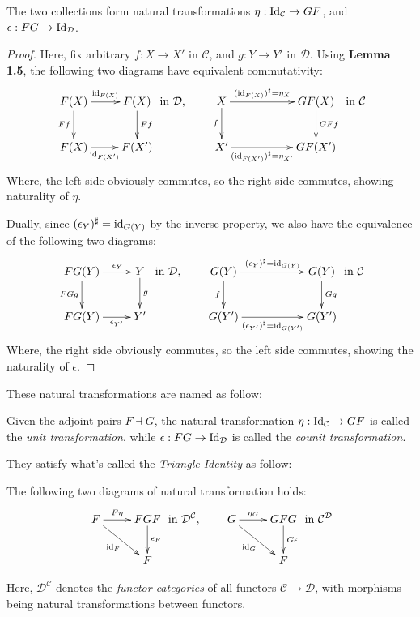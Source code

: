 \documentclass{article}
\begin{document}
\begin{prop}
The two collections form natural transformations $\eta:\mathrm{Id}_\mathcal{C}\rightarrow GF$, and $\epsilon:FG\rightarrow \mathrm{Id}_\mathcal{D}$.
\end{prop}
\begin{proof}
    Here, fix arbitrary $f:X\rightarrow X'$ in $\mathcal{C}$, and $g:Y\rightarrow Y'$ in $\mathcal{D}$. Using \textbf{Lemma 1.5}, the following two diagrams have equivalent commutativity:
    \[\xymatrix{
        F(X) \ar[d]_-{Ff} \ar[r]^-{\id_{F(X)}} & F(X) \ar[d]^-{Ff}\\
        F(X)\ar[r]_-{\id_{F(X')}} & F(X')
    } \text{ in }\mathcal{D},\quad \quad \xymatrix{
        X \ar[d]_-{f} \ar[rr]^-{(\id_{F(X)})^\sharp=\eta_X} && GF(X) \ar[d]^-{GFf}\\
        X'\ar[rr]_-{(\id_{F(X')})^\sharp=\eta_{X'}} && GF(X')
    } \text{ in }\mathcal{C}\]
    Where, the left side obviously commutes, so the right side commutes, showing naturality of $\eta$.

    Dually, since $(\epsilon_Y)^\sharp = \mathrm{id}_{G(Y)}$ by the inverse property, we also have the equivalence of the following two diagrams:
    \[\xymatrix{
        FG(Y) \ar[d]_-{FGg} \ar[r]^-{\epsilon_Y} & Y \ar[d]^-{g}\\
        FG(Y)\ar[r]_-{\epsilon_{Y'}} & Y'
    } \text{ in }\mathcal{D},\quad \quad \xymatrix{
        G(Y) \ar[d]_-{f} \ar[rr]^-{(\epsilon_Y)^\sharp = \id_{G(Y)}} && G(Y) \ar[d]^-{Gg}\\
        G(Y')\ar[rr]_-{(\epsilon_{Y'})^\sharp=\id_{G(Y')}} && G(Y')
    } \text{ in }\mathcal{C}\]
    Where, the right side obviously commutes, so the left side commutes, showing the naturality of $\epsilon$.
\end{proof}

These natural transformations are named as follow:
\begin{defn}
    Given the adjoint pairs $F\dashv G$, the natural transformation $\eta:\mathrm{Id}_\mathcal{C}\rightarrow GF$ is called the \emph{unit transformation}, while $\epsilon:FG\rightarrow \mathrm{Id}_\mathcal{D}$ is called the \emph{counit transformation}.
\end{defn}

\hfil

They satisfy what's called the \emph{Triangle Identity} as follow:
\begin{prop}
    The following two diagrams of natural transformation holds:
    \[\xymatrix{
        F \ar[r]^-{F\eta} \ar[dr]_-{\id_F} & FGF \ar[d]^-{\epsilon_F}\\
        & F
    } \text{ in }\mathcal{D}^\mathcal{C},\quad \quad \xymatrix{
        G \ar[r]^-{\eta_G} \ar[dr]_-{\id_G} & GFG \ar[d]^-{G\epsilon}\\
        & F
    } \text{ in }\mathcal{C}^\mathcal{D}\]
\end{prop}
Here, $\mathcal{D}^\mathcal{C}$ denotes the \emph{functor categories} of all functors $\mathcal{C}\rightarrow \mathcal{D}$, with morphisms being natural transformations between functors.
\end{document}
